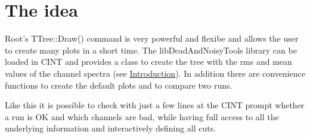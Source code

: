 \hypertarget{root_lib_Idea}{}\section{The idea}\label{root_lib_Idea}
Root's {\ttfamily T\-Tree\-::\-Draw()} command is very powerful and flexibe and allows the user to create many plots in a short time. The lib\-Dead\-And\-Noisy\-Tools library can be loaded in C\-I\-N\-T and provides a class to create the tree with the rms and mean values of the channel spectra (see \hyperlink{index_Introduction}{Introduction}). In addition there are convenience functions to create the default plots and to compare two runs.

Like this it is possible to check with just a few lines at the C\-I\-N\-T prompt whether a run is O\-K and which channels are bad, while having full access to all the underlying information and interactively defining all cuts.


